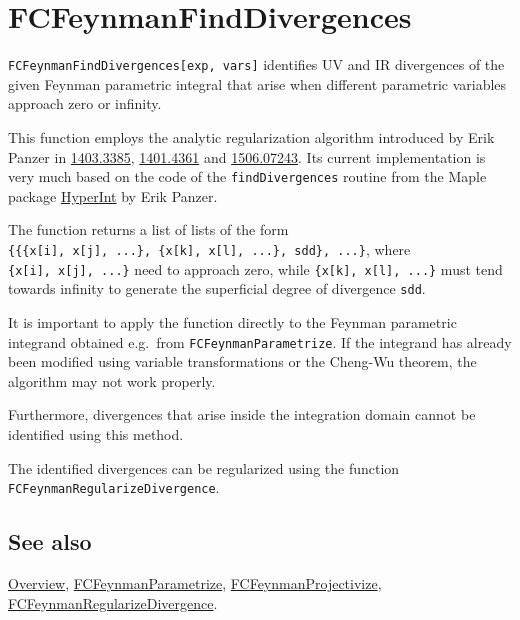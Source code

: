 \documentclass[../FeynCalcManual.tex]{subfiles}
\begin{document}
\hypertarget{fcfeynmanfinddivergences}{%
\section{FCFeynmanFindDivergences}\label{fcfeynmanfinddivergences}}

\texttt{FCFeynmanFindDivergences[\allowbreak{}exp,\ \allowbreak{}vars]}
identifies UV and IR divergences of the given Feynman parametric
integral that arise when different parametric variables approach zero or
infinity.

This function employs the analytic regularization algorithm introduced
by Erik Panzer in \href{https://arxiv.org/abs/1403.3385}{1403.3385},
\href{https://arxiv.org/abs/1401.4361}{1401.4361} and
\href{https://arxiv.org/abs/1506.07243}{1506.07243}. Its current
implementation is very much based on the code of the
\texttt{findDivergences} routine from the Maple package
\href{https://bitbucket.org/PanzerErik/hyperint/}{HyperInt} by Erik
Panzer.

The function returns a list of lists of the form
\texttt{\{\allowbreak{}\{\allowbreak{}\{\allowbreak{}x[\allowbreak{}i],\ \allowbreak{}x[\allowbreak{}j],\ \allowbreak{}...\},\ \allowbreak{}\{\allowbreak{}x[\allowbreak{}k],\ \allowbreak{}x[\allowbreak{}l],\ \allowbreak{}...\},\ \allowbreak{}sdd\},\ \allowbreak{}...\}},
where
\texttt{\{\allowbreak{}x[\allowbreak{}i],\ \allowbreak{}x[\allowbreak{}j],\ \allowbreak{}...\}}
need to approach zero, while
\texttt{\{\allowbreak{}x[\allowbreak{}k],\ \allowbreak{}x[\allowbreak{}l],\ \allowbreak{}...\}}
must tend towards infinity to generate the superficial degree of
divergence \texttt{sdd}.

It is important to apply the function directly to the Feynman parametric
integrand obtained e.g.~from \texttt{FCFeynmanParametrize}. If the
integrand has already been modified using variable transformations or
the Cheng-Wu theorem, the algorithm may not work properly.

Furthermore, divergences that arise inside the integration domain cannot
be identified using this method.

The identified divergences can be regularized using the function
\texttt{FCFeynmanRegularizeDivergence}.

\subsection{See also}

\hyperlink{toc}{Overview},
\hyperlink{fcfeynmanparametrize}{FCFeynmanParametrize},
\hyperlink{fcfeynmanprojectivize}{FCFeynmanProjectivize},
\hyperlink{fcfeynmanregularizedivergence}{FCFeynmanRegularizeDivergence}.
\end{document}
